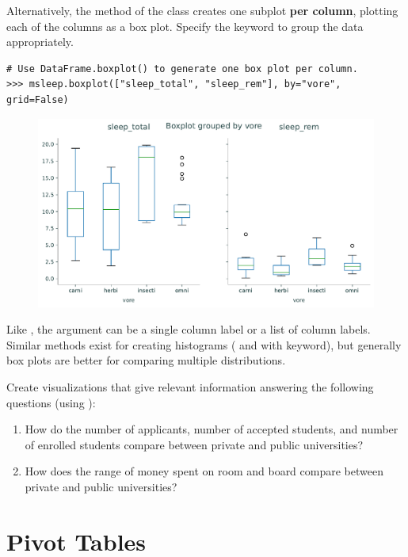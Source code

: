 Alternatively, the  method of the  class creates one subplot \textbf{per column}, plotting each of the columns as a box plot.
Specify the  keyword to group the data appropriately.

\begin{lstlisting}
# Use DataFrame.boxplot() to generate one box plot per column.
>>> msleep.boxplot(["sleep_total", "sleep_rem"], by="vore", grid=False)
\end{lstlisting}

\begin{figure}[H]
    \centering
    \includegraphics[width=.7\textwidth]{figures/mammal_box_cols.pdf}
\end{figure}

Like , the  argument can be a single column label or a list of column labels.
Similar methods exist for creating histograms ( and  with  keyword), but generally box plots are better for comparing multiple distributions.

\begin{problem}
Create visualizations that give relevant information answering the following questions (using ):
\begin{enumerate}
\item How do the number of applicants, number of accepted students, and number of enrolled students compare between private and public universities?

\item How does the range of money spent on room and board compare between private and public universities?
\end{enumerate}
\end{problem}

\section*{Pivot Tables} %

